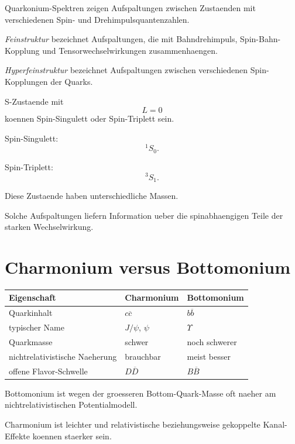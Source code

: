 Quarkonium-Spektren zeigen Aufspaltungen zwischen Zustaenden mit verschiedenen
Spin- und Drehimpulsquantenzahlen.

\begin{definitionbox}
\emph{Feinstruktur} bezeichnet Aufspaltungen, die mit Bahndrehimpuls, Spin-Bahn-Kopplung
und Tensorwechselwirkungen zusammenhaengen.

\emph{Hyperfeinstruktur} bezeichnet Aufspaltungen zwischen verschiedenen
Spin-Kopplungen der Quarks.
\end{definitionbox}

\begin{examplebox}
S-Zustaende mit
\[
    L=0
\]
koennen Spin-Singulett oder Spin-Triplett sein.

Spin-Singulett:
\[
    {}^1S_0.
\]

Spin-Triplett:
\[
    {}^3S_1.
\]

Diese Zustaende haben unterschiedliche Massen.
\end{examplebox}

\begin{conceptbox}
Solche Aufspaltungen liefern Information ueber die spinabhaengigen Teile der starken
Wechselwirkung.
\end{conceptbox}

\section{Charmonium versus Bottomonium}

\begin{center}
\begin{tabular}{|p{4.0cm}|p{5.0cm}|p{5.0cm}|}
\hline
Eigenschaft & Charmonium & Bottomonium \\
\hline
Quarkinhalt & $c\overline{c}$ & $b\overline{b}$ \\
\hline
typischer Name & $J/\psi$, $\psi$ & $\Upsilon$ \\
\hline
Quarkmasse & schwer & noch schwerer \\
\hline
nichtrelativistische Naeherung & brauchbar & meist besser \\
\hline
offene Flavor-Schwelle & $D\overline{D}$ & $B\overline{B}$ \\
\hline
\end{tabular}
\end{center}

\begin{conceptbox}
Bottomonium ist wegen der groesseren Bottom-Quark-Masse oft naeher am
nichtrelativistischen Potentialmodell.

Charmonium ist leichter und relativistische beziehungsweise gekoppelte Kanal-Effekte
koennen staerker sein.
\end{conceptbox}

